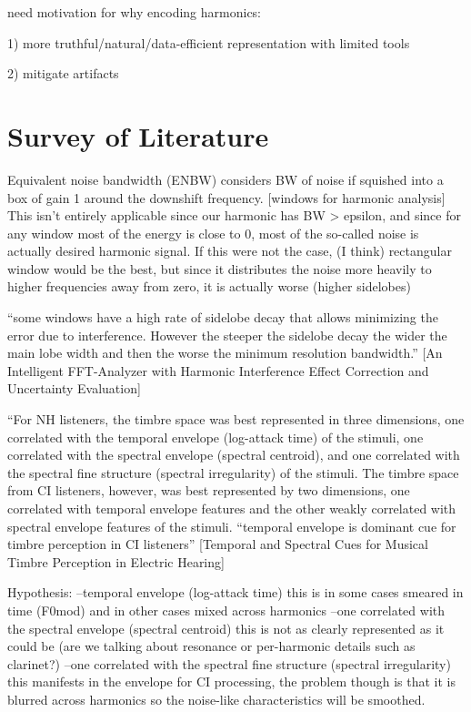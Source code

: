 \documentclass [11pt, proquest] {uwthesis}[2015/03/03]
\begin{document}
need motivation for why encoding harmonics:

1) more truthful/natural/data-efficient representation with limited tools

2) mitigate artifacts

\section{Survey of Literature}

Equivalent noise bandwidth (ENBW) considers BW of noise if squished into a box of gain 1 around the downshift frequency.  [windows for harmonic analysis] This isn't entirely applicable since our harmonic has BW > epsilon, and since for any window most of the energy is close to 0, most of the so-called noise is actually desired harmonic signal.  If this were not the case, (I think) rectangular window would be the best, but since it distributes the noise more heavily to higher frequencies away from zero, it is actually worse (higher sidelobes)

``some windows have a high rate of sidelobe decay that allows minimizing the error due to interference. However the steeper the sidelobe decay
the wider the main lobe width and then the worse the minimum resolution bandwidth.'' [An Intelligent FFT-Analyzer with Harmonic Interference Effect Correction and Uncertainty Evaluation]

``For NH listeners, the timbre space was best represented in three dimensions, one correlated with the temporal envelope (log-attack time) of the stimuli, one correlated with the spectral envelope (spectral centroid), and one correlated with the spectral fine structure (spectral irregularity) of the stimuli. The timbre space from CI listeners, however, was best represented by two dimensions, one correlated with temporal envelope features and the other weakly correlated with spectral envelope features of the stimuli. 
``temporal envelope is dominant cue for timbre perception in CI listeners''
[Temporal and Spectral Cues for Musical Timbre
Perception in Electric Hearing]

Hypothesis:
--temporal envelope (log-attack time)
this is in some cases smeared in time (F0mod) and in other cases mixed across harmonics
--one correlated with the spectral envelope (spectral centroid)
this is not as clearly represented as it could be (are we talking about resonance or per-harmonic details such as clarinet?)
--one correlated with the spectral fine structure (spectral irregularity)
this manifests in the envelope for CI processing, the problem though is that it is blurred across harmonics so the noise-like characteristics will be smoothed.
\end{document}
